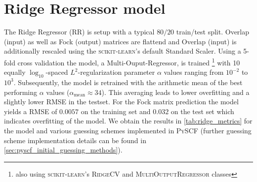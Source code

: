 \section{Ridge Regressor model} %
\label{sec:ridge_regressor_model}
The Ridge Regressor (RR) is setup with a typical $80 / 20$ train/test split. Overlap (input) as well as Fock (output) matrices are flattend and Overlap (input) is additionally rescaled using the \textsc{scikit-learn}'s default Standard Scaler. \parencite{ref:sk-learn} Using a 5-fold cross validation the model, a Multi-Ouput-Regressor, is trained \footnote{also using \textsc{scikit-learn}'s \textsc{RidgeCV} and \textsc{MultiOutputRegressor} classes} with 10 equally $\log_{10}$-spaced $L^2$-regularization parameter $\alpha$ values ranging from $10^{-2}$ to $10^{3}$. Subsequently, the model is retrained with the arithmetic mean of the best performing $\alpha$ values ($\alpha_{\text{mean}} \approx 34$). This averaging leads to lower overfitting and a slightly lower RMSE in the testset. %
For the Fock matrix prediction the model yields a RMSE of $0.0057$ on the training set and $0.032$ on the test set which indicates overfitting of the model. We obtain the results in \autoref{tab:ridge_metrics} for the model and various guessing schemes implemented in \textsc{PySCF} (further guessing scheme implementation details can be found in \autoref{sec:pyscf_initial_guessing_methods}).

